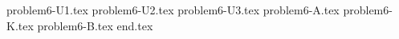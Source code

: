 \documentclass{../../../../style/mkimain}
\begin{document}
{problem6-U1.tex}
{problem6-U2.tex}
{problem6-U3.tex}
{problem6-A.tex}
{problem6-K.tex}
{problem6-B.tex}
{end.tex}
\end{document}
